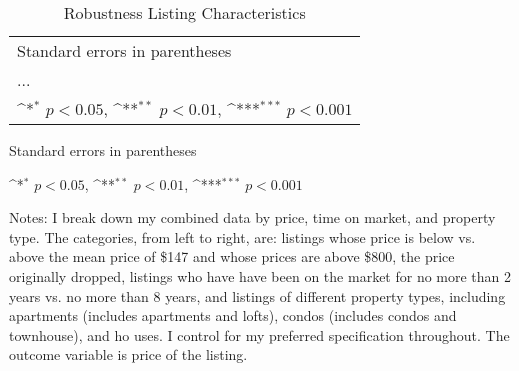 \documentclass[11pt, oneside]{article}
\begin{document}
\newpage
\begin{landscape}
	\begin{table}[htbp]\centering
		\def\sym#1{\ifmmode^{#1}\else\(^{#1}\)\fi}
		\caption{Robustness Listing Characteristics}
		\begin{tabular}{l*{9}{c}}
			\hline\hline
			\hline\hline
			\multicolumn{10}{l}{\footnotesize Standard errors in parentheses}\\
			\multicolumn{10}{l}{\footnotesize ...}\\
			\multicolumn{10}{l}{\footnotesize \sym{*} \(p<0.05\), \sym{**} \(p<0.01\), \sym{***} \(p<0.001\)}\\
		\end{tabular}
		\begin{tablenotes}
			\item \footnotesize Standard errors in parentheses
			\item \footnotesize \sym{*} \(p<0.05\), \sym{**} \(p<0.01\), \sym{***} \(p<0.001\)
			\item Notes: I break down my combined data by price, time on market, and property type. The categories, from left to right, are: listings whose price is below vs. above the mean price of \$147 and whose prices are above \$800, the price originally dropped, listings who have have been on the market for no more than 2 years vs. no more than 8 years, and listings of different property types, including apartments (includes apartments and lofts), condos (includes condos and townhouse), and ho uses. I control for my preferred specification throughout. The outcome variable is price of the listing.
		\end{tablenotes}
	\end{table}
\end{landscape}
\end{document}
